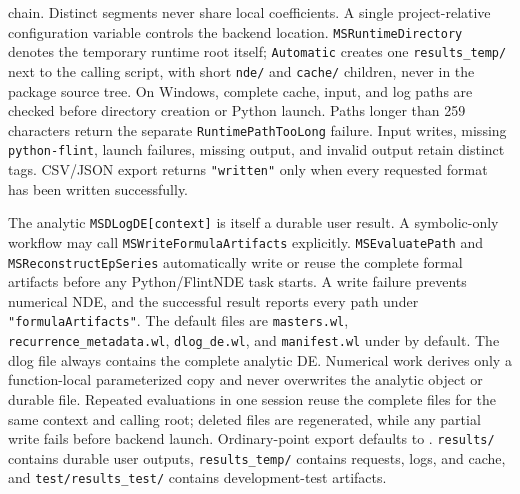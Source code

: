 \documentclass[11pt,a4paper]{article}
\begin{document}
chain. Distinct segments never share local coefficients. A single
project-relative configuration variable controls the backend location.
\texttt{MSRuntimeDirectory} denotes the temporary runtime root itself; \texttt{Automatic}
creates one \texttt{results\_temp/} next to the calling script, with short \texttt{nde/} and
\texttt{cache/} children, never in the package source tree. On Windows, complete cache,
input, and log paths are checked before directory creation or Python launch. Paths longer
than 259 characters return the separate \texttt{RuntimePathTooLong} failure. Input writes,
missing \texttt{python-flint}, launch failures, missing output, and invalid output retain
distinct tags. CSV/JSON export returns \texttt{"written"} only when every requested format
has been written successfully.

The analytic \texttt{MSDLogDE[context]} is itself a durable user result. A symbolic-only
workflow may call \texttt{MSWriteFormula\allowbreak Artifacts} explicitly. \texttt{MSEvaluatePath}
and \texttt{MSReconstructEp\allowbreak Series} automatically write or reuse the complete formal
artifacts before any Python/FlintNDE task starts. A write failure prevents numerical NDE,
and the successful result reports every path under \texttt{"formula\allowbreak Artifacts"}. The default
files are \texttt{masters.wl},
\texttt{recurrence\_metadata.wl}, \texttt{dlog\_de.wl}, and \texttt{manifest.wl} under
 by default. The dlog file always contains the
complete analytic DE. Numerical work derives only a function-local parameterized copy and never
overwrites the analytic object or durable file. Repeated evaluations in one session reuse the
complete files for the same context and calling root; deleted files are regenerated, while any
partial write fails before backend launch. Ordinary-point export defaults to
.
\texttt{results/} contains durable user outputs, \texttt{results\_temp/} contains requests,
logs, and cache, and \texttt{test/results\_test/} contains development-test artifacts.
\end{document}
